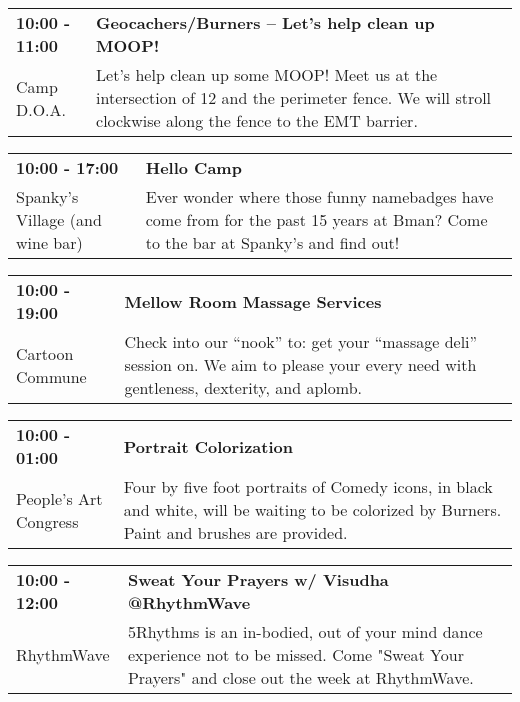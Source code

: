 \begin{tabular}{ p{1in} p{2.2in} }
    \textbf{10:00 - 11:00} & \textbf{Geocachers/Burners -- Let's help clean up MOOP!} \\
    Camp D.O.A. \newline  & Let's help clean up some MOOP! Meet us at the intersection of 12 and the perimeter fence. We will stroll clockwise along the fence to the EMT barrier. \\
    \hline 
\end{tabular}
    
\begin{tabular}{ p{1in} p{2.2in} }
    \textbf{10:00 - 17:00} & \textbf{Hello Camp} \\
    Spanky's Village (and wine bar) \newline  & Ever wonder where those funny namebadges have come from for the past 15 years at Bman?  Come to the bar at Spanky's and find out! \\
    \hline 
\end{tabular}
    
\begin{tabular}{ p{1in} p{2.2in} }
    \textbf{10:00 - 19:00} & \textbf{Mellow Room Massage Services} \\
    Cartoon Commune \newline  & Check into our ``nook'' to: get your ``massage deli'' session on. We aim to please your every need with gentleness, dexterity, and aplomb. \\
    \hline 
\end{tabular}
    
\begin{tabular}{ p{1in} p{2.2in} }
    \textbf{10:00 - 01:00} & \textbf{Portrait Colorization} \\
    People's Art Congress \newline  & Four by five foot portraits of Comedy icons, in black and white, will be waiting to be colorized by Burners. Paint and brushes are provided. \\
    \hline 
\end{tabular}
    
\begin{tabular}{ p{1in} p{2.2in} }
    \textbf{10:00 - 12:00} & \textbf{Sweat Your Prayers w/ Visudha @RhythmWave} \\
    RhythmWave \newline  & 5Rhythms is an in-bodied, out of your mind dance experience not to be missed. Come "Sweat Your Prayers" and close out the week at RhythmWave. \\
    \hline 
\end{tabular}
    
